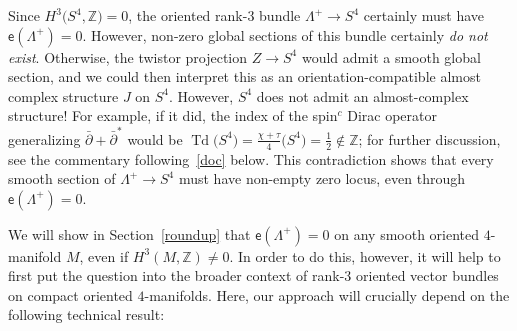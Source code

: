 \documentclass[pdftex]{sigma}
\numberwithin{equation}{section}
\def\ZZ{\mathbb{Z}}
\DeclareMathOperator{\todd}{Td}
\begin{document}
\begin{xpl} Since $H^3\big(S^4, \ZZ\big)=0$, the oriented rank-$3$ bundle $\Lambda^+\to S^4$ certainly must have
 $\mathsf{e} (\Lambda^+)=0$. However, non-zero global sections of this bundle
certainly {\em do not exist}. Otherwise, the twistor projection
$Z\to S^4$ would admit a smooth global section,
and we could then interpret this as an orientation-compatible almost complex structure
$J$ on $S^4$. However, $S^4$ does not admit an almost-complex structure! For example,
if it did, the index of the spin$^c$ Dirac operator generalizing $\bar{\partial} + \bar{\partial}^*$
would be $\todd \big(S^4\big) = \frac{\chi + \tau}{4} \big(S^4\big) = \frac{1}{2}\not\in \ZZ$; for further discussion, see the commentary following~\eqref{doc} below. This contradiction shows that every smooth section of \mbox{$\Lambda^+\to S^4$} must have non-empty
zero locus, even through $\mathsf{e} (\Lambda^+)=0$. \end{xpl}

We will show in Section~\ref{roundup} that $\mathsf{e} (\Lambda^+)=0$ on any
smooth oriented $4$-manifold $M$, even if $H^3( M, \ZZ)\neq 0$. In order to do this, however,
it will help to first put the question into the broader context of rank-$3$ oriented vector bundles
on compact oriented $4$-manifolds. Here, our approach will crucially depend on the following technical result:
\end{document}
